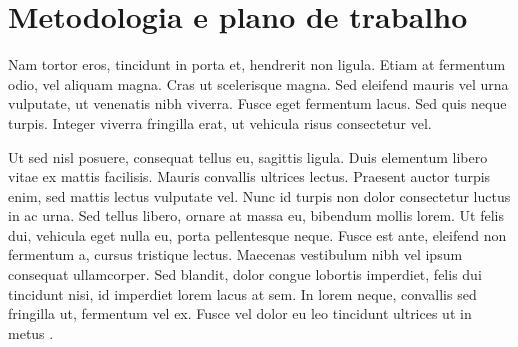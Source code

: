 \section{Metodologia e plano de trabalho}

Nam tortor eros, tincidunt in porta et, hendrerit non ligula. Etiam at fermentum odio, vel aliquam magna. Cras ut scelerisque magna. Sed eleifend mauris vel urna vulputate, ut venenatis nibh viverra. Fusce eget fermentum lacus. Sed quis neque turpis. Integer viverra fringilla erat, ut vehicula risus consectetur vel.

Ut sed nisl posuere, consequat tellus eu, sagittis ligula. Duis elementum libero vitae ex mattis facilisis. Mauris convallis ultrices lectus. Praesent auctor turpis enim, sed mattis lectus vulputate vel. Nunc id turpis non dolor consectetur luctus in ac urna. Sed tellus libero, ornare at massa eu, bibendum mollis lorem. Ut felis dui, vehicula eget nulla eu, porta pellentesque neque. Fusce est ante, eleifend non fermentum a, cursus tristique lectus. Maecenas vestibulum nibh vel ipsum consequat ullamcorper. Sed blandit, dolor congue lobortis imperdiet, felis dui tincidunt nisi, id imperdiet lorem lacus at sem. In lorem neque, convallis sed fringilla ut, fermentum vel ex. Fusce vel dolor eu leo tincidunt ultrices ut in metus \cites{dummy2024thesis}{dummy2024thesis}{dummy2024website}.